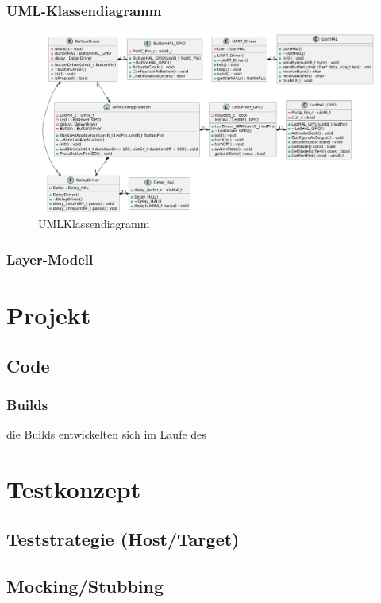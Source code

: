 \documentclass[12pt,a4paper]{article}
\begin{document}
\subsubsection{UML-Klassendiagramm}
\begin{figure}[htbp]
  \centering
  \includegraphics[width=\textwidth]{LED_Blink_UML.png}
  \caption{UMLKlassendiagramm}
  \label{fig:uml_led_blink}
\end{figure}
\subsubsection{Layer-Modell}

\newpage

\section{Projekt}
\subsection{Code}
\subsubsection{Builds}
die Builds entwickelten sich im Laufe des
\


\newpage

\section{Testkonzept}
\subsection{Teststrategie (Host/Target)}
\subsection{Mocking/Stubbing}
\end{document}
